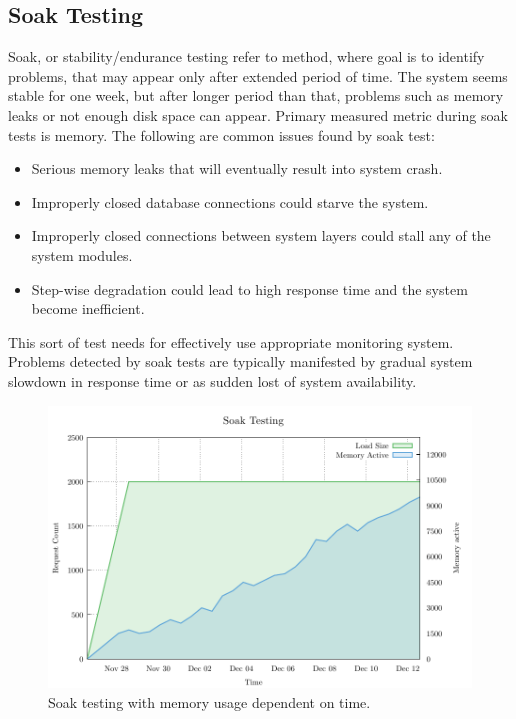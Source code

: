 \subsection*{Soak Testing}
\label{Soak Testing}
Soak, or stability/endurance testing refer to method, where goal is to identify problems, that may appear only after extended period of time. The system seems stable for one week, but after longer period than that, problems such as memory leaks or not enough disk space can appear. Primary measured metric during soak tests is memory. The following are common issues found by soak test:

\begin{itemize}
	\setlength\itemsep{0em}
	\item Serious memory leaks that will eventually result into system crash.
	\item Improperly closed database connections could starve the system.
	\item Improperly closed connections between system layers could stall any of the system modules.
	\item Step-wise degradation could lead to high response time and the system become inefficient.
\end{itemize}

This sort of test needs for effectively use appropriate monitoring system. Problems detected by soak tests are typically manifested by gradual system slowdown in response time or as sudden lost of system availability.

\begin{figure}[H]
  \centering
  \includegraphics[width=15cm]{obrazky-figures/soak_testing.pdf}
  \caption{Soak testing with memory usage dependent on time.}
  \label{fig:soak_test}
\end{figure}

